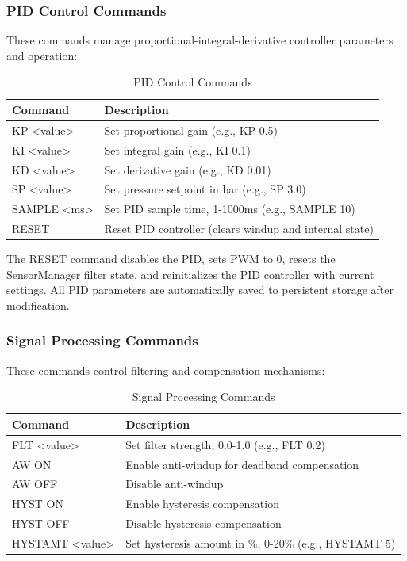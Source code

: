 \subsubsection{PID Control Commands}
These commands manage proportional-integral-derivative controller parameters and operation:

\begin{table}[H]
\centering
\begin{tabular}{@{}ll@{}}
\toprule
\textbf{Command} & \textbf{Description} \\
\midrule
KP <value> & Set proportional gain (e.g., KP 0.5) \\
KI <value> & Set integral gain (e.g., KI 0.1) \\
KD <value> & Set derivative gain (e.g., KD 0.01) \\
SP <value> & Set pressure setpoint in bar (e.g., SP 3.0) \\
SAMPLE <ms> & Set PID sample time, 1-1000ms (e.g., SAMPLE 10) \\
RESET & Reset PID controller (clears windup and internal state) \\
\bottomrule
\end{tabular}
\caption{PID Control Commands}
\end{table}

The RESET command disables the PID, sets PWM to 0, resets the SensorManager filter state, and reinitializes the PID controller with current settings. All PID parameters are automatically saved to persistent storage after modification.

\subsubsection{Signal Processing Commands}
These commands control filtering and compensation mechanisms:

\begin{table}[H]
\centering
\begin{tabular}{@{}ll@{}}
\toprule
\textbf{Command} & \textbf{Description} \\
\midrule
FLT <value> & Set filter strength, 0.0-1.0 (e.g., FLT 0.2) \\
AW ON & Enable anti-windup for deadband compensation \\
AW OFF & Disable anti-windup \\
HYST ON & Enable hysteresis compensation \\
HYST OFF & Disable hysteresis compensation \\
HYSTAMT <value> & Set hysteresis amount in \%, 0-20\% (e.g., HYSTAMT 5) \\
\bottomrule
\end{tabular}
\caption{Signal Processing Commands}
\end{table}

